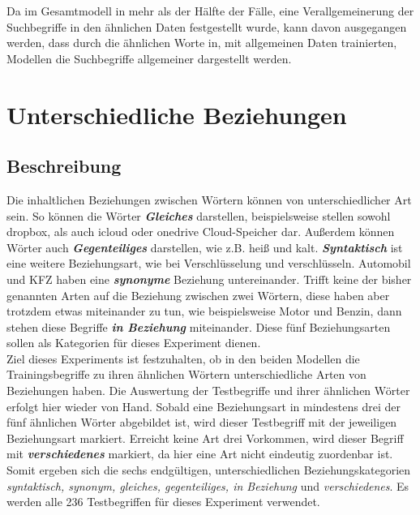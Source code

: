 \documentclass[12pt,a4paper]{report}
\begin{document}
Da im Gesamtmodell in mehr als der Hälfte der Fälle, eine Verallgemeinerung der Suchbegriffe in den ähnlichen Daten festgestellt wurde, kann davon ausgegangen werden, dass durch die ähnlichen Worte in, mit allgemeinen Daten trainierten, Modellen die Suchbegriffe allgemeiner dargestellt werden.\\
		
		
	
	\section{Unterschiedliche Beziehungen}
		\subsection*{Beschreibung}
		Die inhaltlichen Beziehungen zwischen Wörtern können von unterschiedlicher Art sein. So können die Wörter \textit{\textbf{Gleiches}} darstellen, beispielsweise stellen sowohl \glqq dropbox\grqq, als auch \glqq icloud\grqq{}  oder \glqq onedrive\grqq{} Cloud-Speicher dar. Außerdem können Wörter auch \textit{\textbf{Gegenteiliges}} darstellen, wie z.B. \glqq heiß\grqq{} und \glqq kalt\grqq. \textit{\textbf{Syntaktisch}} ist eine weitere Beziehungsart, wie bei \glqq Verschlüsselung\grqq{} und \glqq verschlüsseln\grqq. \glqq Automobil\grqq{} und \glqq KFZ\grqq{} haben eine \textit{\textbf{synonyme}} Beziehung untereinander. Trifft keine der bisher genannten Arten auf die Beziehung zwischen zwei Wörtern, diese haben aber trotzdem etwas miteinander zu tun, wie beispielsweise \glqq Motor\grqq{} und \glqq Benzin\grqq{}, dann stehen diese Begriffe \textit{\textbf{in Beziehung}} miteinander. Diese fünf Beziehungsarten sollen als Kategorien für dieses Experiment dienen.\\
		 Ziel dieses Experiments ist festzuhalten, ob in den beiden Modellen die Trainingsbegriffe zu ihren ähnlichen Wörtern unterschiedliche Arten von Beziehungen haben. Die Auswertung der Testbegriffe und ihrer ähnlichen Wörter erfolgt hier wieder von Hand. Sobald eine Beziehungsart in mindestens drei der fünf ähnlichen Wörter abgebildet ist, wird dieser Testbegriff mit der jeweiligen Beziehungsart markiert. Erreicht keine Art drei Vorkommen, wird dieser Begriff mit \textit{\textbf{verschiedenes}} markiert, da hier eine Art nicht eindeutig zuordenbar ist. Somit ergeben sich die sechs endgültigen, unterschiedlichen Beziehungskategorien \textit{syntaktisch, synonym, gleiches, gegenteiliges, in Beziehung} und \textit{verschiedenes}. Es werden alle 236 Testbegriffen für dieses Experiment verwendet.\\
		
\end{document}
